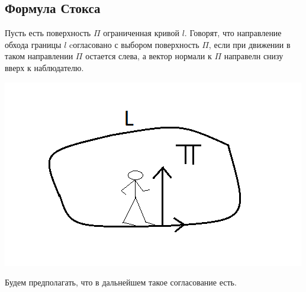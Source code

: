 \documentclass[../../main.tex]{subfiles}
\begin{document}
	\subsection{Формула Стокса}
	
	Пусть есть поверхность $\Pi$ ограниченная кривой $l$. Говорят, что направление обхода границы $l$ cогласовано с выбором поверхность $\Pi$, если при движении в таком направлении $\Pi$ остается слева, а вектор нормали к $\Pi$ направелн снизу вверх к наблюдателю.
	
	\begin{center}
		\includegraphics[scale = 0.8]{lec_25_Human_direction}
	\end{center}
	
	Будем предполагать, что в дальнейшем такое согласование есть.
	
\end{document}
